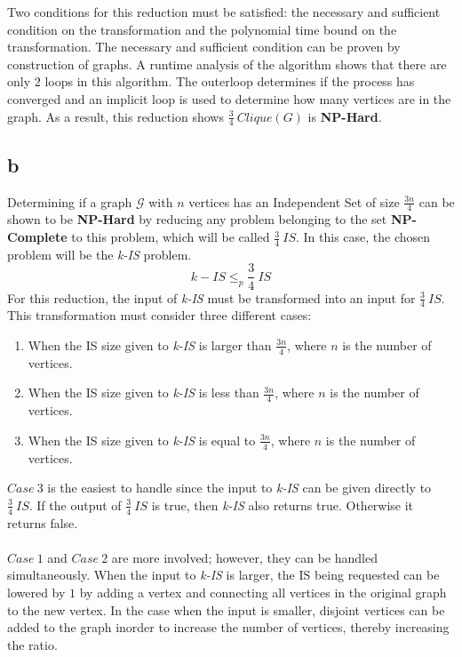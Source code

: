 \documentclass[12pt]{article}
\begin{document}
Two conditions for this reduction must be satisfied: the necessary and sufficient
condition on the transformation and the polynomial time bound on the transformation.
The necessary and sufficient condition can be proven by construction of graphs.  A
runtime analysis of the algorithm shows that there are only $2$ loops in this 
algorithm.  The outerloop determines if the process has converged and an implicit
loop is used to determine how many vertices are in the graph.  As a result, this
reduction shows $\frac{3}{4}\ Clique(G)$ is \textbf{NP-Hard}. 
\subsection*{b}
Determining if a graph $\mathcal{G}$ with $n$
vertices has an Independent Set of size $\frac{3n}{4}$ can be shown to be
\textbf{NP-Hard} by reducing any problem belonging to the set
\textbf{NP-Complete} to this problem, which will be called \textit{$\frac{3}{4}\ IS$}.
In this case, the chosen problem will be the \textit{k-IS} problem.
\[
k-IS \leq_{p} \frac{3}{4}\ IS
\]
For this reduction, the input of \textit{k-IS} must be transformed
into an input for $\frac{3}{4}\ IS$.  This transformation must
consider three different cases:
\begin{enumerate}
    \item When the IS size given to \textit{k-IS} is larger than
          $\frac{3n}{4}$, where $n$ is the number of vertices.
    \item When the IS size given to \textit{k-IS} is less than
          $\frac{3n}{4}$, where $n$ is the number of vertices.   
    \item When the IS size given to \textit{k-IS} is equal to 
          $\frac{3n}{4}$, where $n$ is the number of vertices.   
\end{enumerate}
$Case\ 3$ is the easiest to handle since the input to \textit{k-IS}
can be given directly to $\frac{3}{4}\ IS$.  If the output of 
$\frac{3}{4}\ IS$ is true, then \textit{k-IS} also returns true.
Otherwise it returns false.\\\\
$Case\ 1$ and $Case\ 2$ are more involved; however, they can be handled
simultaneously.  When the input to \textit{k-IS} is larger, the
IS being requested can be lowered by $1$ by adding a vertex and 
connecting all vertices in the original graph to the new vertex. In the case when the input is smaller, disjoint
vertices can be added to the graph inorder to increase the number of vertices,
thereby increasing the ratio.
\end{document}
